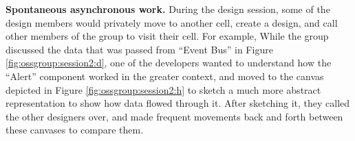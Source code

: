 \textbf{Spontaneous asynchronous work.} During the design session, some of the design members would privately move to another cell, create a design, and call other members of the group to visit their cell. For example, While the group discussed the data that was passed from ``Event Bus'' in Figure \ref{fig:ossgroup:session2:d}, one of the developers wanted to understand how the ``Alert'' component worked in the greater context, and moved to the canvas depicted in Figure \ref{fig:ossgroup:session2:h} to sketch a much more abstract representation to show how data flowed through it. After sketching it, they called the other designers over, and made frequent movements back and forth between these canvases to compare them.

%
%
